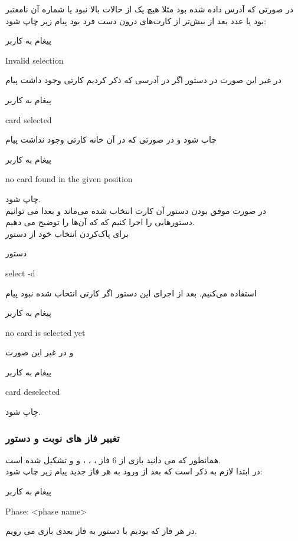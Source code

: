 \documentclass[]{article}
\begin{document}
در صورتی که آدرس داده شده  بود مثلا هیچ یک از حالات بالا نبود یا 
شماره آن نامعتبر بود یا عدد بعد از  بیش‌تر از کارت‌های درون دست 
فرد بود پیام زیر چاپ شود:
\begin{mybox}[colback=yellow]{پیغام به کاربر}
	\begin{latin}	
		Invalid selection
	\end{latin}
\end{mybox}
در غیر این صورت در دستور  اگر در آدرسی که ذکر کردیم کارتی وجود 
داشت پیام
\begin{mybox}[colback=yellow]{پیغام به کاربر}
	\begin{latin}	
		card selected
	\end{latin}
\end{mybox}
چاپ شود و در صورتی که در آن خانه کارتی وجود نداشت پیام 
\begin{mybox}[colback=yellow]{پیغام به کاربر}
	\begin{latin}	
		no card found in the given position
	\end{latin}
\end{mybox}
چاپ شود.
\\
در صورت موفق بودن دستور  آن کارت انتخاب شده می‌ماند و بعدا می 
توانیم دستورهایی را اجرا کنیم که که آن‌ها را توضیح می دهیم.
\\
برای پاک‌کردن انتخاب خود از دستور 
\begin{mybox}[colback=yellow]{دستور}
	\begin{latin}	
		select -d
	\end{latin}
\end{mybox}
استفاده می‌کنیم. بعد از اجرای این دستور اگر کارتی انتخاب شده نبود پیام
\begin{mybox}[colback=yellow]{پیغام به کاربر}
	\begin{latin}	
		no card is selected yet
	\end{latin}
\end{mybox}
و در غیر این صورت
\begin{mybox}[colback=yellow]{پیغام به کاربر}
	\begin{latin}	
		card deselected
	\end{latin}
\end{mybox}
چاپ شود.

\subsubsection*{{\titr تغییر فاز های نوبت و دستور }}
همانطور که می دانید بازی از 6 فاز
  ،  ،  ،  و 
  و 
 تشکیل شده است.
\\
    در ابتدا لازم به ذکر است که بعد از ورود به هر فاز جدید پیام زیر چاپ شود:
\begin{mybox}[colback=yellow]{پیغام به کاربر}
	\begin{latin}	
		Phase: <phase name>
	\end{latin}
\end{mybox}
    در هر فاز که بودیم با دستور  به فاز بعدی بازی می رویم.
\end{document}
